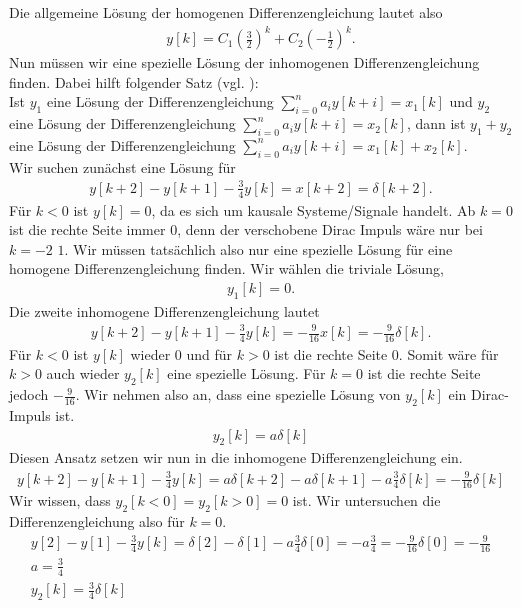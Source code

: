 \documentclass[11pt,a4paper,DIV=12]{scrartcl}
\begin{document}
Die allgemeine Lösung der homogenen Differenzengleichung lautet also
\begin{gather}
	y[k]=C_1\left(\frac{3}{2}\right)^k+C_2\left(-\frac{1}{2}\right)^k.
\end{gather}
Nun müssen wir eine spezielle Lösung der inhomogenen Differenzengleichung finden. Dabei hilft folgender Satz (vgl. \cite[Kap. 5 S. 83]{Witt2013}):\\
Ist $y_1$ eine Lösung der Differenzengleichung $\sum_{i=0}^na_iy[k+i]=x_1[k]$ und $y_2$ eine Lösung der Differenzengleichung $\sum_{i=0}^na_iy[k+i]=x_2[k]$, dann ist $y_1+y_2$ eine Lösung der Differenzengleichung $\sum_{i=0}^{n}a_iy[k+i]=x_1[k]+x_2[k]$.\\
Wir suchen zunächst eine Lösung für
\begin{gather}
	y[k+2]-y[k+1]-\frac{3}{4}y[k]=x[k+2]=\delta[k+2].
\end{gather}
Für $k<0$ ist $y[k]=0$, da es sich um kausale Systeme/Signale handelt. Ab $k=0$ ist die rechte Seite immer $0$, denn der verschobene Dirac Impuls wäre nur bei $k=-2$ $1$. Wir müssen tatsächlich also nur eine spezielle Lösung für eine homogene Differenzengleichung finden. Wir wählen die triviale Lösung,
\begin{gather}
	y_1[k]=0.
\end{gather}
Die zweite inhomogene Differenzengleichung lautet
\begin{gather}
	y[k+2]-y[k+1]-\frac{3}{4}y[k]=-\frac{9}{16}x[k]=-\frac{9}{16}\delta[k].
\end{gather}
Für $k<0$ ist $y[k]$ wieder $0$ und für $k>0$ ist die rechte Seite $0$. Somit wäre für $k>0$ auch wieder $y_2[k]$ eine spezielle Lösung. Für $k=0$ ist die rechte Seite jedoch $-\frac{9}{16}$. Wir nehmen also an, dass eine spezielle Lösung von $y_2[k]$ ein Dirac-Impuls ist.
\begin{gather}
	y_2[k]=a\delta[k]
\end{gather}
Diesen Ansatz setzen wir nun in die inhomogene Differenzengleichung ein.
\begin{gather}
	y[k+2]-y[k+1]-\frac{3}{4}y[k]=a\delta[k+2]-a\delta[k+1]-a\frac{3}{4}\delta[k]=-\frac{9}{16}\delta[k]
\end{gather}
Wir wissen, dass $y_2[k<0]=y_2[k>0]=0$ ist. Wir untersuchen die Differenzengleichung also für $k=0$.
\begin{gather}
	y[2]-y[1]-\frac{3}{4}y[k]=\delta[2]-\delta[1]-a\frac{3}{4}\delta[0]=-a\frac{3}{4}=-\frac{9}{16}\delta[0]=-\frac{9}{16}\\
	a = \frac{3}{4}\\
	y_2[k]=\frac{3}{4}\delta[k]
\end{gather}
\end{document}
